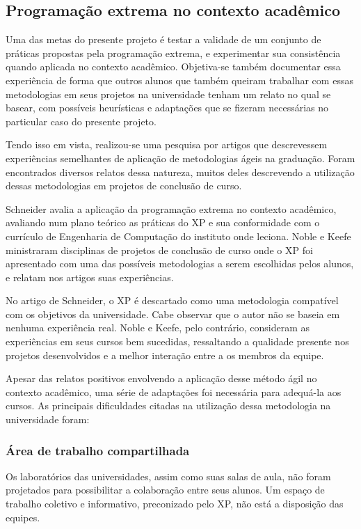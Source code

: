 \documentclass[a4paper,12pt,font=plain,header=plain]{abnt}
\begin{document}
    \subsection{Programação extrema no contexto acadêmico}
      Uma das metas do presente projeto é testar a validade de um conjunto de práticas propostas pela programação extrema, e experimentar sua consistência quando aplicada no contexto acadêmico. Objetiva-se também documentar essa experiência de forma que outros alunos que também queiram trabalhar com essas metodologias em seus projetos na universidade tenham um relato no qual se basear, com possíveis heurísticas e adaptações que se fizeram necessárias no particular caso do presente projeto.

      Tendo isso em vista, realizou-se uma pesquisa por artigos que descrevessem experiências semelhantes de aplicação de metodologias ágeis na graduação. Foram encontrados diversos relatos dessa natureza, muitos deles descrevendo a utilização dessas metodologias em projetos de conclusão de curso.

      Schneider\cite{schneider03} avalia a aplicação da programação extrema no contexto acadêmico, avaliando num plano teórico as práticas do XP e sua conformidade com o currículo de Engenharia de Computação do instituto onde leciona. Noble\cite{noble04} e Keefe\cite{keefe04} ministraram disciplinas de projetos de conclusão de curso onde o XP foi apresentado com uma das possíveis metodologias a serem escolhidas pelos alunos, e relatam nos artigos suas experiências.

      No artigo de Schneider, o XP é descartado como uma metodologia compatível com os objetivos da universidade. Cabe observar que o autor não se baseia em nenhuma experiência real. Noble e Keefe, pelo contrário, consideram as experiências em seus cursos bem sucedidas, ressaltando a qualidade presente nos projetos desenvolvidos e a melhor interação entre a os membros da equipe.

      Apesar das relatos positivos envolvendo a aplicação desse método ágil no contexto acadêmico, uma série de adaptações foi necessária para adequá-la aos cursos. As principais dificuldades citadas na utilização dessa metodologia na universidade foram:

      \subsubsection{Área de trabalho compartilhada}
        Os laboratórios das universidades, assim como suas salas de aula, não foram projetados para possibilitar a colaboração entre seus alunos. Um espaço de trabalho coletivo e informativo, preconizado pelo XP, não está a disposição das equipes.
\end{document}
